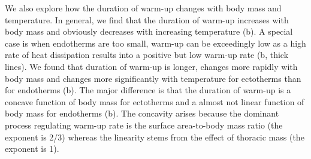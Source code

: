 We also explore how the duration of warm-up changes with body mass and temperature.
In general, we find that the duration of warm-up increases with body mass and obviously decreases with increasing temperature (b).
A special case is when endotherms are too small, warm-up can be exceedingly low as a high rate of heat dissipation results into a positive but low warm-up rate (b, thick lines).
We found that duration of warm-up is longer, changes more rapidly with body mass and changes more significantly with temperature for ectotherms than for endotherms (b). %
The major difference is that the duration of warm-up  is a concave function of body mass for ectotherms and a almost not linear function of body mass for endotherms (b).
The concavity arises because the dominant process regulating warm-up rate is the surface area-to-body mass ratio (the exponent is 2/3) whereas the linearity stems from the effect of thoracic mass (the exponent is 1).





